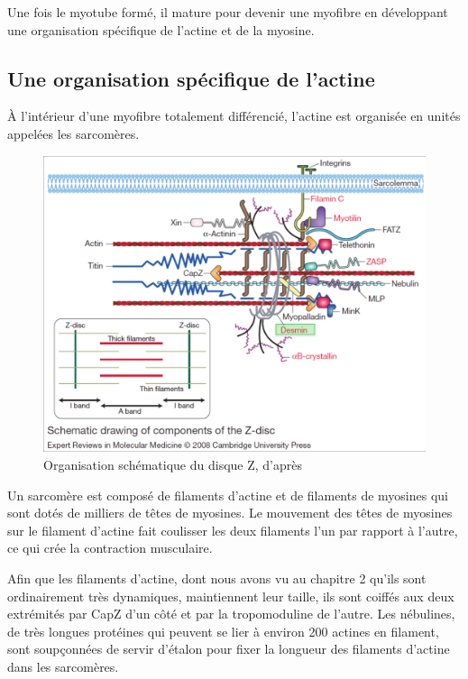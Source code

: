 Une fois le myotube formé, il mature pour devenir une myofibre en développant une organisation spécifique de l'actine et de la myosine.




\subsection{Une organisation spécifique de l'actine}

À l'intérieur d'une myofibre totalement différencié, l'actine est organisée en unités appelées les sarcomères. 

\begin{figure}
\includegraphics[scale=0.2]{Figures/sarcomere.png} 
\caption{Organisation schématique du disque Z, d'après \cite{ferrer_molecular_2008}}
\end{figure}

Un sarcomère est composé de filaments d'actine et de filaments de myosines qui sont dotés de milliers de têtes de myosines. Le mouvement des têtes de myosines sur le filament d'actine fait coulisser les deux filaments l'un par rapport à l'autre, ce qui crée la contraction musculaire. 

Afin que les filaments d'actine, dont nous avons vu au chapitre 2 qu'ils sont ordinairement très dynamiques, maintiennent leur taille, ils sont coiffés aux deux extrémités par CapZ d'un côté et par la tropomoduline de l'autre.
Les nébulines, de très longues protéines qui peuvent se lier à environ 200 actines en filament, sont soupçonnées de servir d'étalon pour fixer la longueur des filaments d'actine dans les sarcomères. 



